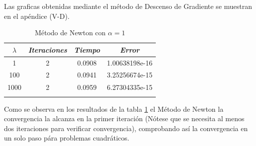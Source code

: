 \documentclass[conference]{IEEEtran}
\begin{document}
Las graficas obtenidas mediante el método de Descenso de Gradiente se muestran
en el apéndice (V-D).

\begin{table}[htbp]
	\caption{Método de Newton con $\alpha=1$}
	\begin{center}
		\begin{tabular}{|c|c|c|c|}
			\hline
			\textbf{\textit{$\lambda$}}& \textbf{\textit{Iteraciones}}& \textbf{\textit{Tiempo}}& \textbf{\textit{Error}} \\
			\hline
			1& 2 & 0.0908 & 1.00638198e-16 \\
			100& 2 & 0.0941 & 3.25256674e-15 \\
			1000& 2 & 0.0959 & 6.27304335e-15 \\
			\hline
			\multicolumn{4}{l}{}
		\end{tabular}
		\label{tabn}
	\end{center}
\end{table}

Como se observa en los resultados de la tabla \ref{tabn} el Método de Newton la
convergencia la alcanza en la primer iteración (Nótese que se necesita al menos
dos iteraciones para verificar convergencia), comprobando así la convergencia en
un solo paso pára problemas cuadráticos.
\end{document}
